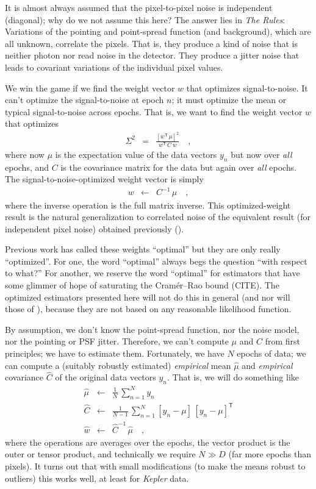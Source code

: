 \documentclass[12pt, letterpaper, preprint]{aastex}
\newcommand{\project}[1]{\textsl{#1}}
\newcommand{\transpose}[1]{{#1}^{\!\mathsf T}}
\newcommand{\inverse}[1]{{#1}^{-1}}
\begin{document}
It is almost always assumed that the pixel-to-pixel noise is independent (diagonal);
  why do we not assume this here?
The answer lies in \emph{The Rules}:
Variations of the pointing and point-spread function (and background),
  which are all unknown,
  correlate the pixels.
That is, they produce a kind of noise that is neither photon nor read noise in the detector.
They produce a jitter noise that leads to covariant variations of the individual pixel values.

We win the game if we find the weight vector $w$ that optimizes signal-to-noise.
It can't optimize the signal-to-noise at epoch $n$;
  it must optimize the mean or typical signal-to-noise across epochs.
That is, we want to find the weight vector $w$ that optimizes
\begin{eqnarray}
  \Sigma^2 &=& \frac{[\transpose{w}\, \mu]^2}{\transpose{w}\, C\, w}
  \quad ,
\end{eqnarray}
where now $\mu$ is the expectation value of the data vectors $y_n$ but now over \emph{all} epochs,
  and $C$ is the covariance matrix for the data but again over \emph{all} epochs.
The signal-to-noise-optimized weight vector is simply
\begin{eqnarray}
  w &\leftarrow& \inverse{C}\, \mu
  \quad ,
\end{eqnarray}
  where the inverse operation is the full matrix inverse.
This optimized-weight result is the natural generalization to correlated noise
  of the equivalent result (for independent pixel noise)
  obtained previously (\citealt{naylor}).

Previous work has called these weights ``optimal'' but they are only really ``optimized''.
For one, the word ``optimal'' always begs the question ``with respect to what?''
For another, we reserve the word ``optimal'' for estimators
  that have some glimmer of hope of saturating the Cram\'er--Rao bound (CITE).
The optimized estimators presented here will not do this in general
  (and nor will those of \citealt{naylor}),
  because they are not based on any reasonable likelihood function.

By assumption, we don't know the point-spread function,
  nor the noise model,
  nor the pointing or PSF jitter.
Therefore, we can't compute $\mu$ and $C$ from first principles; we have to estimate them.
Fortunately, we have $N$ epochs of data;
  we can compute a (suitably robustly estimated)
  \emph{empirical} mean $\hat{\mu}$ and \emph{empirical} covariance $\hat{C}$
  of the original data vectors $y_n$.
That is, we will do something like
\begin{eqnarray}
  \hat{\mu} &\leftarrow& \frac{1}{N}\,\sum_{n=1}^N y_n
  \\
  \hat{C} &\leftarrow& \frac{1}{N-1}\,\sum_{n=1}^N [y_n - \mu]\,\transpose{[y_n - \mu]}
  \\
  \hat{w} &\leftarrow& \inverse{\hat{C}}\, \hat{\mu}
  \quad ,
\end{eqnarray}
  where the operations are averages over the epochs,
  the vector product is the outer or tensor product,
  and technically we require $N \gg D$ (far more epochs than pixels).
It turns out that with small modifications
  (to make the means robust to outliers)
  this works well, at least for \project{Kepler} data.
\end{document}

